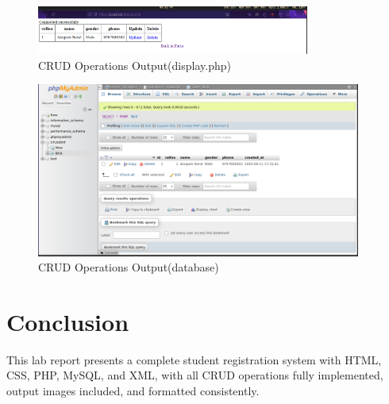\documentclass[a4paper,12pt]{article}
\begin{document}
\begin{figure}[H]
    \centering
    \includegraphics[width=0.8\textwidth]{6_screenshot.png}
    \caption{CRUD Operations Output(display.php)}
\end{figure}

\begin{figure}[H]
    \centering
    \includegraphics[width=0.95\textwidth, height=0.6\textheight]{7_screenshot.png}
    \caption{CRUD Operations Output(database)}
\end{figure}

\section{Conclusion}
This lab report presents a complete student registration system with HTML, CSS, PHP, MySQL, and XML, with all CRUD operations fully implemented, output images included, and formatted consistently.
\end{document}
